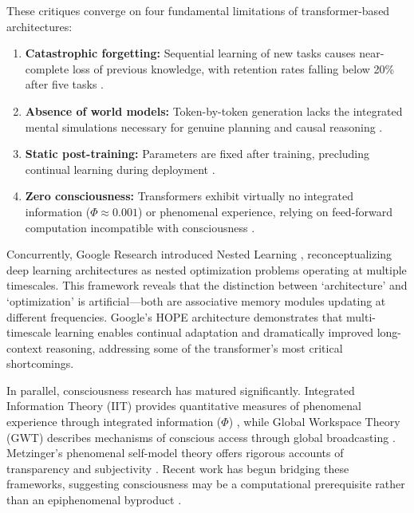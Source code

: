 \documentclass[11pt]{article}
\begin{document}
These critiques converge on four fundamental limitations of transformer-based architectures:

\begin{enumerate}
    \item \textbf{Catastrophic forgetting:} Sequential learning of new tasks causes near-complete loss of previous knowledge, with retention rates falling below 20\% after five tasks \cite{mccloskey1989,french1999}.

    \item \textbf{Absence of world models:} Token-by-token generation lacks the integrated mental simulations necessary for genuine planning and causal reasoning \cite{lecun2025,bengio2013}.

    \item \textbf{Static post-training:} Parameters are fixed after training, precluding continual learning during deployment \cite{thrun1998}.

    \item \textbf{Zero consciousness:} Transformers exhibit virtually no integrated information ($\Phi \approx 0.001$) or phenomenal experience, relying on feed-forward computation incompatible with consciousness \cite{tononi2016,dehaene2011}.
\end{enumerate}

Concurrently, Google Research introduced Nested Learning \cite{behrouz2025}, reconceptualizing deep learning architectures as nested optimization problems operating at multiple timescales. This framework reveals that the distinction between `architecture' and `optimization' is artificial—both are associative memory modules updating at different frequencies. Google's HOPE architecture demonstrates that multi-timescale learning enables continual adaptation and dramatically improved long-context reasoning, addressing some of the transformer's most critical shortcomings.

In parallel, consciousness research has matured significantly. Integrated Information Theory (IIT) provides quantitative measures of phenomenal experience through integrated information ($\Phi$) \cite{oizumi2014,tononi2008}, while Global Workspace Theory (GWT) describes mechanisms of conscious access through global broadcasting \cite{baars1988,dehaene2006}. Metzinger's phenomenal self-model theory offers rigorous accounts of transparency and subjectivity \cite{metzinger2003,metzinger2024}. Recent work has begun bridging these frameworks, suggesting consciousness may be a computational prerequisite rather than an epiphenomenal byproduct \cite{friston2010,seth2018}.
\end{document}
